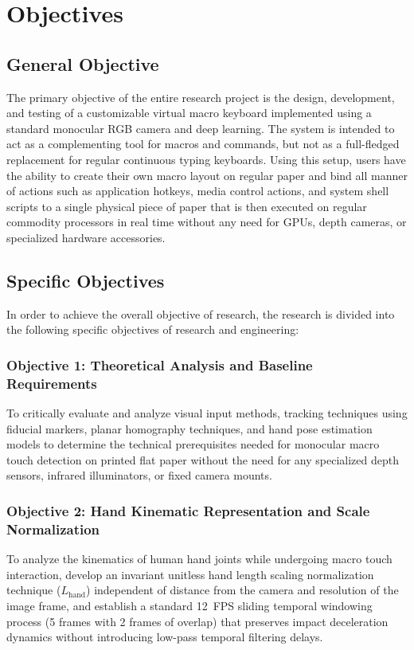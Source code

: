 \chapter{Objectives}
\label{chap:objectives}

\section{General Objective}
\label{sec:general_objective}
The primary objective of the entire research project is the design, development, and testing of a customizable virtual macro keyboard implemented using a standard monocular RGB camera and deep learning. The system is intended to act as a complementing tool for macros and commands, but not as a full-fledged replacement for regular continuous typing keyboards. Using this setup, users have the ability to create their own macro layout on regular paper and bind all manner of actions such as application hotkeys, media control actions, and system shell scripts to a single physical piece of paper that is then executed on regular commodity processors in real time without any need for GPUs, depth cameras, or specialized hardware accessories.

\section{Specific Objectives}
\label{sec:specific_objectives}
In order to achieve the overall objective of research, the research is divided into the following specific objectives of research and engineering:

\subsection{Objective 1: Theoretical Analysis and Baseline Requirements}
\label{subsec:obj1_theoretical}
To critically evaluate and analyze visual input methods, tracking techniques using fiducial markers, planar homography techniques, and hand pose estimation models to determine the technical prerequisites needed for monocular macro touch detection on printed flat paper without the need for any specialized depth sensors, infrared illuminators, or fixed camera mounts.

\subsection{Objective 2: Hand Kinematic Representation and Scale Normalization}
\label{subsec:obj2_kinematics}
To analyze the kinematics of human hand joints while undergoing macro touch interaction, develop an invariant unitless hand length scaling normalization technique ($L_{\text{hand}}$) independent of distance from the camera and resolution of the image frame, and establish a standard 12~FPS sliding temporal windowing process (5 frames with 2 frames of overlap) that preserves impact deceleration dynamics without introducing low-pass temporal filtering delays.

